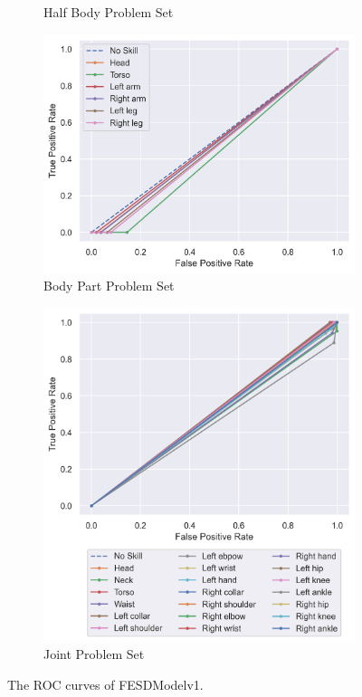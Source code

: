 \begin{figure}
\begin{subfigure}[b]{0.47\linewidth}
      \caption[]{Half Body Problem Set}
      \label{fig:hb_roc_v1}
  \end{subfigure}
  \hfill
  \begin{subfigure}[b]{0.47\linewidth}
      \centering
      \includegraphics[width=\textwidth]{figures/Results/v1_bs_60_is_64_e_100/bp/roc.png}
      \caption[]{Body Part Problem Set}
      \label{fig:bp_roc_v1}
  \end{subfigure}
  \hfill
  \begin{subfigure}[b]{0.47\linewidth}
      \centering
      \includegraphics[width=\textwidth]{figures/Results/v1_bs_60_is_64_e_100/jt/roc.png}
      \caption[]{Joint Problem Set}
      \label{fig:jt_roc_v1}
  \end{subfigure}
  \caption[ROC Curves of FESDModelv1]{The ROC curves of FESDModelv1.}
  \label{fig:roc_v1}
\end{figure}

